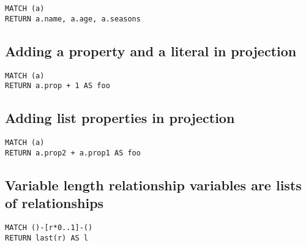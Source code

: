 \begin{lstlisting}
MATCH (a)
RETURN a.name, a.age, a.seasons
\end{lstlisting}

\subsection{Adding a property and a literal in projection}

\begin{lstlisting}
MATCH (a)
RETURN a.prop + 1 AS foo
\end{lstlisting}

\subsection{Adding list properties in projection}

\begin{lstlisting}
MATCH (a)
RETURN a.prop2 + a.prop1 AS foo
\end{lstlisting}

\subsection{Variable length relationship variables are lists of relationships}

\begin{lstlisting}
MATCH ()-[r*0..1]-()
RETURN last(r) AS l
\end{lstlisting}

